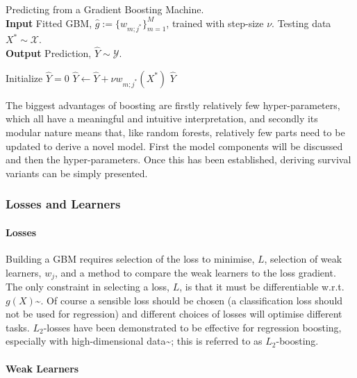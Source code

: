 \documentclass[
  letterpaper,
]{scrbook}
\let\oldparagraph\paragraph
\renewcommand{\paragraph}[1]{\oldparagraph{#1}\mbox{}}
\theoremstyle{plain}
\theoremstyle{definition}
\theoremstyle{remark}
\begin{document}
\begin{algorithm}[H]
\caption{Predicting from a Gradient Boosting Machine. \\
\textbf{Input} Fitted GBM, $\hat{g}:= \{w_{m;j^*}\}^M_{m=1}$, trained with step-size $\nu$. Testing data $X^* \sim \mathcal{X}$. \\
\textbf{Output} Prediction, $\hat{Y}\sim \mathcal{Y}$.}\label{alg:surv_gbm_pred}
\begin{algorithmic}[1]
\State Initialize $\hat{Y}= 0$
\State $\hat{Y}\gets \hat{Y}+ \nu w_{m;j^*}(X^*)$
\EndFor
\Return $\hat{Y}$
\end{algorithmic}
\end{algorithm}

The biggest advantages of boosting are firstly relatively few
hyper-parameters, which all have a meaningful and intuitive
interpretation, and secondly its modular nature means that, like random
forests, relatively few parts need to be updated to derive a novel
model. First the model components will be discussed and then the
hyper-parameters. Once this has been established, deriving survival
variants can be simply presented.

\subsubsection{Losses and Learners}

\paragraph{Losses}

Building a GBM requires selection of the loss to minimise, \(L\),
selection of weak learners, \(w_j\), and a method to compare the weak
learners to the loss gradient. The only constraint in selecting a loss,
\(L\), is that it must be differentiable w.r.t.
\(g(X)\)\textasciitilde{}\cite{Hastie2001}. Of course a sensible loss
should be chosen (a classification loss should not be used for
regression) and different choices of losses will optimise different
tasks. \(L_2\)-losses have been demonstrated to be effective for
regression boosting, especially with high-dimensional
data\textasciitilde{}\cite{Buhlmann2003}; this is referred to as
\(L_2\)-boosting.

\paragraph{Weak Learners}
\end{document}
